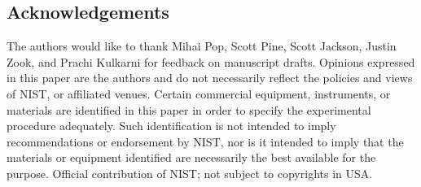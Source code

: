 \documentclass[linenumbers]{bmcart}
\begin{document}
\begin{backmatter}
\subsection*{Acknowledgements}
 The authors would like to thank Mihai
Pop, Scott Pine, Scott Jackson, Justin Zook, and Prachi Kulkarni for
feedback on manuscript drafts. Opinions expressed in this paper are the
authors and do not necessarily reflect the policies and views of NIST,
or affiliated venues. Certain commercial equipment, instruments, or
materials are identified in this paper in order to specify the
experimental procedure adequately. Such identification is not intended
to imply recommendations or endorsement by NIST, nor is it intended to
imply that the materials or equipment identified are necessarily the
best available for the purpose. Official contribution of NIST; not
subject to copyrights in USA.







\end{backmatter}
\end{document}
